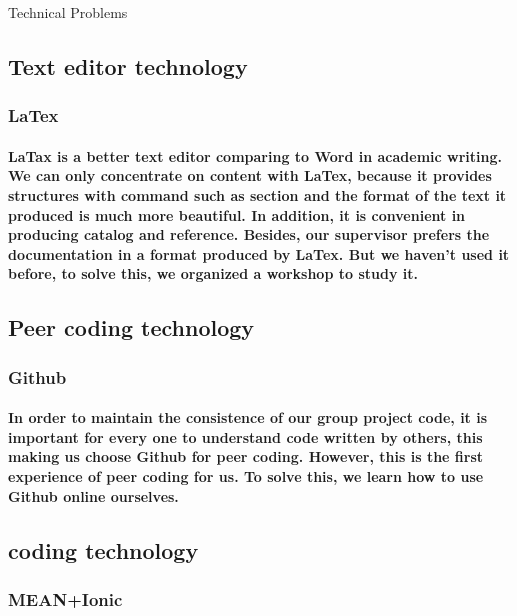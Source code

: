 \documentclass[12pt]{amsart}
\title{}
\author{}
\date{} %
\makeatletter
\renewcommand{\section}{\@startsection{section}{1}{0mm}
  {-\baselineskip}{0.5\baselineskip}{\bf\leftline}}
\makeatother
\begin{document}
\section{Technical Problems}


\subsection{\textbf{Text editor technology}}
\subsubsection{\textbf{LaTex}}
\paragraph{LaTax is a better text editor comparing to Word in academic writing. We can only concentrate on content with LaTex, because it provides structures with command such as section and the format of the text it produced is much more beautiful. In addition, it is convenient in producing catalog and reference. Besides, our supervisor prefers the documentation in a format produced by LaTex. But we haven't used it before, to solve this, we organized a workshop to study it.}



\subsection{\textbf{Peer coding technology}}
\subsubsection{\textbf{Github}}
\paragraph{In order to maintain the consistence of our group project code, it is important for every one to understand code written by others, this making us choose Github for peer coding.
However, this is the first experience of peer coding for us. To solve this, we learn how to use Github online ourselves.}



\subsection{\textbf{coding technology}}
\subsubsection{\textbf{MEAN+Ionic}}
\end{document}
